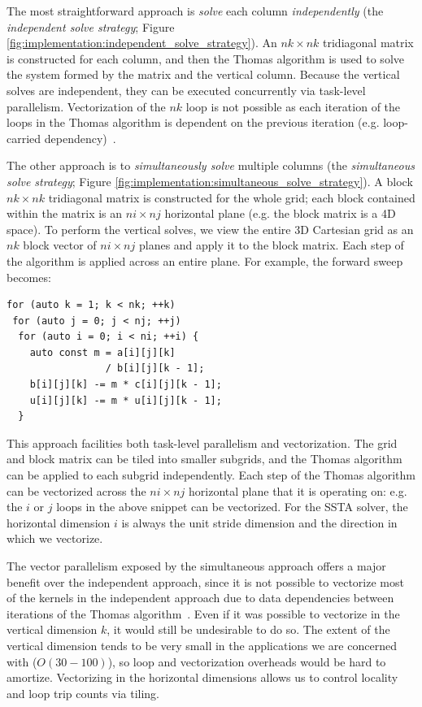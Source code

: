 \documentclass{sig-alternate-05-2015}
\begin{document}
The most straightforward approach is \emph{solve} each column
  \emph{independently} (the \emph{independent solve strategy}; Figure
  \ref{fig:implementation:independent_solve_strategy}).
An \(nk \times nk\) tridiagonal matrix is constructed for each column, and then
  the Thomas algorithm is used to solve the system formed by the matrix and the
  vertical column.
Because the vertical solves are independent, they can be executed concurrently
  via task-level parallelism.
Vectorization of the \(nk\) loop is not possible as each iteration of the loops
  in the Thomas algorithm is dependent on the previous iteration (e.g.
  loop-carried dependency)~\cite{povitsky}.

The other approach is to \emph{simultaneously solve} multiple columns (the
  \emph{simultaneous solve strategy}; Figure
  \ref{fig:implementation:simultaneous_solve_strategy}).
A block \(nk \times nk\) tridiagonal matrix is constructed for the whole grid;
  each block contained within the matrix is an \(ni \times nj\) horizontal plane
  (e.g. the block matrix is a 4D space).
To perform the vertical solves, we view the entire 3D Cartesian grid as an
  \(nk\) block vector of \(ni \times nj\) planes and apply it to the block
  matrix.
Each step of the algorithm is applied across an entire plane.
For example, the forward sweep becomes:
\begin{lstlisting}
for (auto k = 1; k < nk; ++k)
 for (auto j = 0; j < nj; ++j)
  for (auto i = 0; i < ni; ++i) {
    auto const m = a[i][j][k]
                 / b[i][j][k - 1];
    b[i][j][k] -= m * c[i][j][k - 1];
    u[i][j][k] -= m * u[i][j][k - 1];
  } 
\end{lstlisting}
This approach facilities both task-level parallelism and vectorization.
The grid and block matrix can be tiled into smaller subgrids, and the Thomas
  algorithm can be applied to each subgrid independently.
Each step of the Thomas algorithm can be vectorized across the \(ni \times nj\)
  horizontal plane that it is operating on: e.g. the \(i\) or \(j\) loops in the
  above snippet can be vectorized.
For the SSTA solver, the horizontal dimension \(i\) is always the unit stride
  dimension and the direction in which we vectorize.

The vector parallelism exposed by the simultaneous approach offers a major
  benefit over the independent approach, since it is not possible to vectorize
  most of the kernels in the independent approach due to data dependencies
  between iterations of the Thomas algorithm~\cite{povitsky}.
Even if it was possible to vectorize in the vertical dimension \(k\), it would
  still be undesirable to do so.
The extent of the vertical dimension tends to be very small in the applications
  we are concerned with (\(O(30-100)\)), so loop and vectorization overheads
  would be hard to amortize.
Vectorizing in the horizontal dimensions allows us to control locality and loop
  trip counts via tiling.
\end{document}
